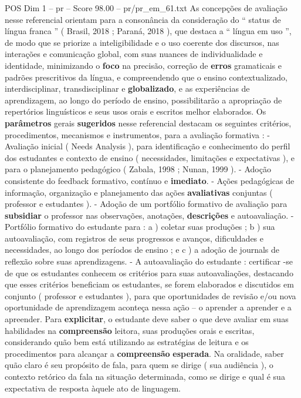 \begin{textsample}{POS Dim 1 – pr – Score 98.00 – pr/pr\_em\_61.txt}
As concepções de avaliação nesse referencial orientam para a consonância da consideração do “ status de língua franca ” ( Brasil, 2018 ; Paraná, 2018 ), que destaca a “ língua em uso ”, de modo que se priorize a inteligibilidade e o uso coerente dos discursos, nas interações e comunicação global, com suas nuances de individualidade e identidade, minimizando o \textbf{foco} na precisão, correção de \textbf{erros} gramaticais e padrões prescritivos da língua, e compreendendo que o ensino contextualizado, interdisciplinar, transdisciplinar e \textbf{globalizado}, e as experiências de aprendizagem, ao longo do período de ensino, possibilitarão a apropriação de repertórios linguísticos e seus usos orais e escritos melhor elaborados.
Os \textbf{parâmetros} gerais \textbf{sugeridos} nesse referencial destacam os seguintes critérios, procedimentos, mecanismos e instrumentos, para a avaliação formativa : - Avaliação inicial ( Needs Analysis ), para identificação e conhecimento do perfil dos estudantes e contexto de ensino ( necessidades, limitações e expectativas ), e para o planejamento pedagógico ( Zabala, 1998 ; Nunan, 1999 ). - Adoção consistente do feedback formativo, contínuo e \textbf{imediato}. - Ações pedagógicas de informação, organização e planejamento das ações \textbf{avaliativas} conjuntas ( professor e estudantes ). - Adoção de um portfólio formativo de avaliação para \textbf{subsidiar} o professor nas observações, anotações, \textbf{descrições} e autoavaliação. - Portfólio formativo do estudante para : a ) coletar suas produções ; b ) sua autoavaliação, com registros de seus progressos e avanços, dificuldades e necessidades, ao longo dos períodos de ensino ; e c ) a adoção de journals de reflexão sobre suas aprendizagens. - A autoavaliação do estudante : certificar -se de que os estudantes conhecem os critérios para suas autoavaliações, destacando que esses critérios beneficiam os estudantes, se forem elaborados e discutidos em conjunto ( professor e estudantes ), para que oportunidades de revisão e/ou nova oportunidade de aprendizagem aconteça nessa ação – o aprender a aprender e a apreender.
Para \textbf{explicitar}, o estudante deve saber o que deve avaliar em suas habilidades na \textbf{compreensão} leitora, suas produções orais e escritas, considerando quão bem está utilizando as estratégias de leitura e os procedimentos para alcançar a \textbf{compreensão} \textbf{esperada}.
Na oralidade, saber quão claro é seu propósito de fala, para quem se dirige ( sua audiência ), o contexto retórico da fala na situação determinada, como se dirige e qual é sua expectativa de resposta àquele ato de linguagem.

\end{textsample}
